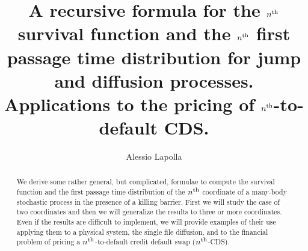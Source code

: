 \documentclass[a4paper,11pt]{amsart}
\title[$\nth$ survival function and $\nth$ first passage time distribution]{A recursive formula for the $\nth$ survival function and the $\nth$ first passage time distribution for jump and diffusion processes. Applications to the pricing of $\nth$-to-default CDS.}
\author{Alessio Lapolla}
\date{}
\theoremstyle{remark}
\newcommand{\nth}{n\textsuperscript{th}}
\begin{document}
\maketitle
\begin{abstract}
  We derive some rather general, but complicated, formulae to compute the survival function and the first passage time distribution of the $\nth$ coordinate of a many-body stochastic process in the presence of a killing barrier. First we will study the case of two coordinates and then we will generalize the results to three or more coordinates. Even if the results are difficult to implement, we will provide examples of their use applying them to a physical system, the single file diffusion, and to the financial problem of pricing a $\nth$-to-default credit default swap ($\nth$-CDS).
\end{abstract}
\end{document}
